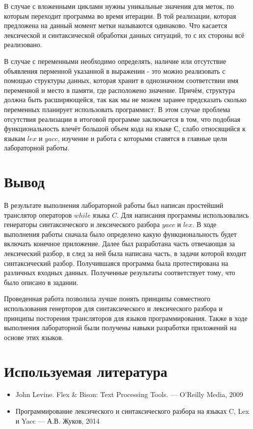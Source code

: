     В случае с вложенными циклами нужны уникальные
    значения для меток, по которым переходит программа
    во время итерации. В той реализации,
    которая предложена на данный момент метки называются одинаково.
    Что касается лексической и синтаксической обработки данных ситуаций,
    то с их стороны всё реализовано.
    
    В случае с переменными необходимо определять,
    наличие или отсутствие объявления перменной указанной в выражении -
    это можно реализовать с помощью структуры данных, которая хранит в однозначном
    соответствии имя переменной и место в памяти, где расположено
    значение.
    Причём, структура должна быть расширяющейся, так как
    мы не можем заранее предсказать сколько переменных планирует
    использовать программист.
    В этом случае проблема отсутствия реализации в итоговой программе
    заключается в том, что подобная функциональность влечёт большой
    объем кода на языке С, слабо относящийся к языкам $lex$ и $yacc$,
    изучение и работа с которыми ставятся в главные цели лабораторной работы.


\section{Вывод}
    В результате выполнения лабораторной работы был написан простейший 
    транслятор операторов $while$ языка $C$. Для написания программы
    использовались генераторы синтаксического и лексического разбора
    $yacc$ и $lex$. В ходе выполнения работы сначала было определено
    какую функциональность будет включать конечное приложение. Далее
    был разработана часть отвечающая за лексический разбор, в след за
    ней была написана часть, в задачи которой входит синтаксический разбор.
    Получившаяся программа была протестирована на различных входных данных.
    Полученные результаты соответствует тому, что было описано в задании.

    Проведенная работа позволила лучше понять принципы совместного
    использования генерторов для синтаксического и лексического разбора и
    принципы посторения трансляторов для языков программирования.
    Также в ходе выполнения лабораторной были получены навыки разработки
    приложений на основе этих языков. 


\section{Используемая литература}
    \begin{itemize}
        \item John Levine. Flex \& Bison: Text Processing Tools. — O\'{}Reilly Media, 2009
        \item Программирование лексического и синтаксического разбора на языках C, Lex и Yacc — А.В. Жуков, 2014
    \end{itemize}


